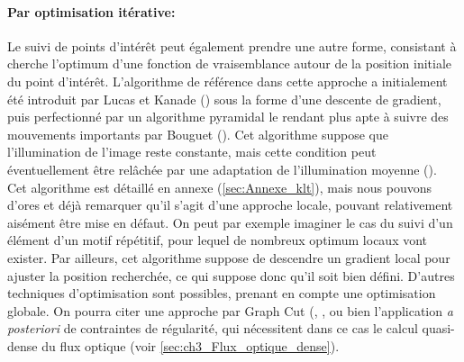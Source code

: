 \paragraph{Par optimisation itérative:\\}
Le suivi de points d'intérêt peut également prendre une autre forme, consistant à cherche l'optimum d'une fonction de vraisemblance autour de la position initiale du point d'intérêt. L'algorithme de référence dans cette approche a initialement été introduit par Lucas et Kanade (\cite{Lucas1981a}) sous la forme d'une descente de gradient, puis perfectionné par un algorithme pyramidal le rendant plus apte à suivre des mouvements importants par Bouguet (\cite{Bouguet2001a}). Cet algorithme suppose que l'illumination de l'image reste constante, mais cette condition peut éventuellement être relâchée par une adaptation de l'illumination moyenne (\cite{Zach2008}). \\

Cet algorithme est détaillé en annexe (\ref{sec:Annexe_klt}), mais nous pouvons d'ores et déjà remarquer qu'il s'agit d'une approche locale, pouvant relativement aisément être mise en défaut. On peut par exemple imaginer le cas du suivi d'un élément d'un motif répétitif, pour lequel de nombreux optimum locaux vont exister. Par ailleurs, cet algorithme suppose de descendre un gradient local pour ajuster la position recherchée, ce qui suppose donc qu'il soit bien défini. D'autres techniques d'optimisation sont possibles, prenant en compte une optimisation globale. On pourra citer une approche par Graph Cut (\cite{Freedman}, \cite{Boykov}, ou bien l'application \emph{a posteriori} de contraintes de régularité, qui nécessitent dans ce cas le calcul quasi-dense du flux optique (voir \ref{sec:ch3_Flux_optique_dense}).


